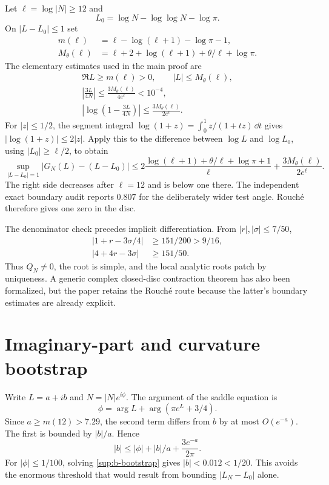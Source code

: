 \documentclass[10pt]{article}
\begin{document}
Let $\ell=\log|N|\ge12$ and
\[
 L_0=\log N-\log\log N-\log\pi.
\]
On $|L-L_0|\le1$ set
\begin{align*}
 m(\ell)&=\ell-\log(\ell+1)-\log\pi-1,\\
 M_\theta(\ell)&=\ell+2+\log(\ell+1)+\theta/\ell+\log\pi.
\end{align*}
The elementary estimates used in the main proof are
\begin{gather}
 \Re L\ge m(\ell)>0,\qquad |L|\le M_\theta(\ell),\label{sup:disc-geometry}\\
 \left|\frac{3L}{4N}\right|
 \le\frac{3M_\theta(\ell)}{4e^\ell}<10^{-4},\label{sup:small-correction}\\
 \left|\log\left(1-\frac{3L}{4N}\right)\right|
 \le\frac{3M_\theta(\ell)}{2e^\ell}.
 \label{sup:log-correction}
\end{gather}
For $|z|\le1/2$, the segment integral
$\log(1+z)=\int_0^1z/(1+tz)\,\dd t$ gives
$|\log(1+z)|\le2|z|$.  Apply this to the difference between $\log L$ and
$\log L_0$, using $|L_0|\ge\ell/2$, to obtain
\begin{equation}\label{sup:rouche-full}
 \sup_{|L-L_0|=1}|G_N(L)-(L-L_0)|
 \le2\frac{\log(\ell+1)+\theta/\ell+\log\pi+1}{\ell}
 +\frac{3M_\theta(\ell)}{2e^\ell}.
\end{equation}
The right side decreases after $\ell=12$ and is below one there.  The
independent exact boundary audit reports $0.807$ for the deliberately wider
test angle.  Rouch\'e therefore gives one zero in the disc.

The denominator check precedes implicit differentiation.  From
$|r|,|\sigma|\le7/50$,
\begin{align}
 |1+r-3\sigma/4|&\ge151/200>9/16,\label{sup:Q-lower}\\
 |4+4r-3\sigma|&\ge151/50.\label{sup:H6-den-lower}
\end{align}
Thus $Q_N\ne0$, the root is simple, and the local analytic roots patch by
uniqueness.  A generic complex closed-disc contraction theorem has also been
formalized, but the paper retains the Rouch\'e route because the latter's
boundary estimates are already explicit.

\section{Imaginary-part and curvature bootstrap}\label{sup:imaginary}

Write $L=a+ib$ and $N=|N|e^{i\phi}$.  The argument of the saddle equation is
\begin{equation}\label{sup:arg-saddle}
 \phi=\arg L+\arg(\pi e^L+3/4).
\end{equation}
Since $a\ge m(12)>7.29$, the second term differs from $b$ by at most
$O(e^{-a})$.  The first is bounded by $|b|/a$.  Hence
\begin{equation}\label{sup:b-bootstrap}
 |b|\le|\phi|+|b|/a+\frac{3e^{-a}}{2\pi}.
\end{equation}
For $|\phi|\le1/100$, solving \eqref{sup:b-bootstrap} gives
$|b|<0.012<1/20$.  This avoids the enormous threshold that would result from
bounding $|L_N-L_0|$ alone.
\end{document}
